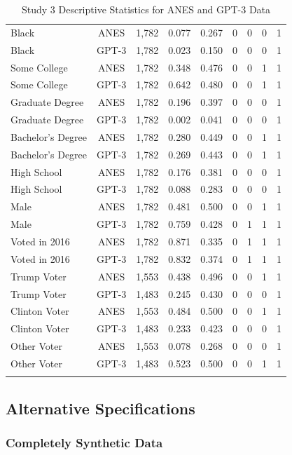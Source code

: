 \documentclass[11pt]{article}
\begin{document}
\begin{table}[!htbp]
\begin{tabular}{@{\extracolsep{5pt}}lcccccccc}
Black & ANES & 1,782 & 0.077 & 0.267 & 0 & 0 & 0 & 1 \\
Black & GPT-3 & 1,782 & 0.023 & 0.150 & 0 & 0 & 0 & 1 \\
Some College & ANES & 1,782 & 0.348 & 0.476 & 0 & 0 & 1 & 1 \\
Some College & GPT-3 & 1,782 & 0.642 & 0.480 & 0 & 0 & 1 & 1 \\
Graduate Degree & ANES & 1,782 & 0.196 & 0.397 & 0 & 0 & 0 & 1 \\
Graduate Degree & GPT-3 & 1,782 & 0.002 & 0.041 & 0 & 0 & 0 & 1 \\
Bachelor's Degree & ANES  & 1,782 & 0.280 & 0.449 & 0 & 0 & 1 & 1 \\
Bachelor's Degree & GPT-3 & 1,782 & 0.269 & 0.443 & 0 & 0 & 1 & 1 \\
High School & ANES  & 1,782 & 0.176 & 0.381 & 0 & 0 & 0 & 1 \\
High School & GPT-3 & 1,782 & 0.088 & 0.283 & 0 & 0 & 0 & 1 \\
Male & ANES & 1,782 & 0.481 & 0.500 & 0 & 0 & 1 & 1 \\
Male & GPT-3 & 1,782 & 0.759 & 0.428 & 0 & 1 & 1 & 1 \\
Voted in 2016 & ANES & 1,782 & 0.871 & 0.335 & 0 & 1 & 1 & 1 \\
Voted in 2016 & GPT-3 & 1,782 & 0.832 & 0.374 & 0 & 1 & 1 & 1 \\
Trump Voter & ANES  & 1,553 & 0.438 & 0.496 & 0 & 0 & 1 & 1 \\
Trump Voter & GPT-3 & 1,483 & 0.245 & 0.430 & 0 & 0 & 0 & 1 \\
Clinton Voter & ANES  & 1,553 & 0.484 & 0.500 & 0 & 0 & 1 & 1 \\
Clinton Voter & GPT-3& 1,483 & 0.233 & 0.423 & 0 & 0 & 0 & 1 \\
Other Voter & ANES & 1,553 & 0.078 & 0.268 & 0 & 0 & 0 & 1 \\
Other Voter & GPT-3 & 1,483 & 0.523 & 0.500 & 0 & 0 & 1 & 1 \\
\bottomrule{}
\end{tabular}
  \caption{Study 3 Descriptive Statistics for ANES and GPT-3 Data}
  \label{tab:gpt3descriptives}
\end{table}


\subsection{Alternative Specifications}

\subsubsection{Completely Synthetic Data}
\end{document}
